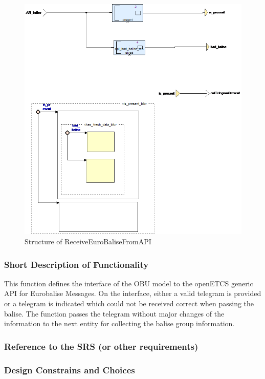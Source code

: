 \documentclass{template/openetcs_report}
\begin{document}
\begin{figure}[hbtp]
\centering
\includegraphics[width=.9\textwidth]{../images/ReceiveEuroBaliseFromAPI_diagram.png}
\caption{Structure of ReceiveEuroBaliseFromAPI}
\end{figure}

\subsubsection{Short Description of Functionality}
This function defines the interface of the OBU model to the openETCS generic API for Eurobalise Messages. On the interface, either a valid telegram is provided or a telegram is indicated which could not be received correct when passing the balise. The function passes the telegram without major changes of the information to the next entity for collecting the balise group information.
	
\subsubsection{Reference to the SRS (or other requirements)}

\subsubsection{Design Constrains and Choices}
\end{document}
